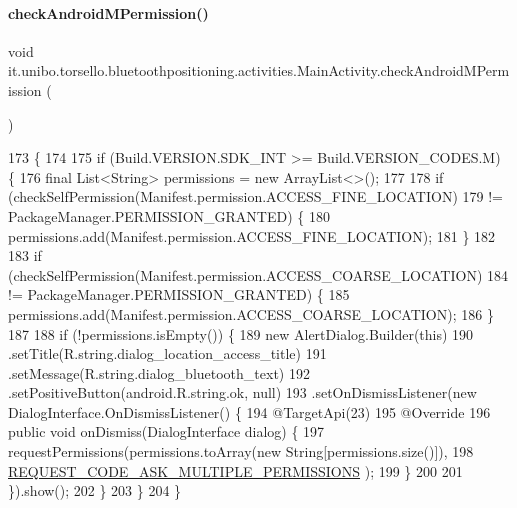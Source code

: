 \paragraph{\texorpdfstring{check\+Android\+M\+Permission()}{checkAndroidMPermission()}}
{\footnotesize\ttfamily void it.\+unibo.\+torsello.\+bluetoothpositioning.\+activities.\+Main\+Activity.\+check\+Android\+M\+Permission (\begin{DoxyParamCaption}{ }\end{DoxyParamCaption})\hspace{0.3cm}{\ttfamily [private]}}


\begin{DoxyCode}
173                                            \{
174 
175         \textcolor{keywordflow}{if} (Build.VERSION.SDK\_INT >= Build.VERSION\_CODES.M) \{
176             \textcolor{keyword}{final} List<String> permissions = \textcolor{keyword}{new} ArrayList<>();
177 
178             \textcolor{keywordflow}{if} (checkSelfPermission(Manifest.permission.ACCESS\_FINE\_LOCATION)
179                     != PackageManager.PERMISSION\_GRANTED) \{
180                 permissions.add(Manifest.permission.ACCESS\_FINE\_LOCATION);
181             \}
182 
183             \textcolor{keywordflow}{if} (checkSelfPermission(Manifest.permission.ACCESS\_COARSE\_LOCATION)
184                     != PackageManager.PERMISSION\_GRANTED) \{
185                 permissions.add(Manifest.permission.ACCESS\_COARSE\_LOCATION);
186             \}
187 
188             \textcolor{keywordflow}{if} (!permissions.isEmpty()) \{
189                 \textcolor{keyword}{new} AlertDialog.Builder(\textcolor{keyword}{this})
190                         .setTitle(R.string.dialog\_location\_access\_title)
191                         .setMessage(R.string.dialog\_bluetooth\_text)
192                         .setPositiveButton(android.R.string.ok, null)
193                         .setOnDismissListener(\textcolor{keyword}{new} DialogInterface.OnDismissListener() \{
194                             @TargetApi(23)
195                             @Override
196                             \textcolor{keyword}{public} \textcolor{keywordtype}{void} onDismiss(DialogInterface dialog) \{
197                                 requestPermissions(permissions.toArray(\textcolor{keyword}{new} String[permissions.size()]),
198                                         \hyperlink{classit_1_1unibo_1_1torsello_1_1bluetoothpositioning_1_1activities_1_1MainActivity_a319aed5cdd5724e043302babe5fcfeac_a319aed5cdd5724e043302babe5fcfeac}{REQUEST\_CODE\_ASK\_MULTIPLE\_PERMISSIONS}
      );
199                             \}
200 
201                         \}).show();
202             \}
203         \}
204     \}
\end{DoxyCode}
